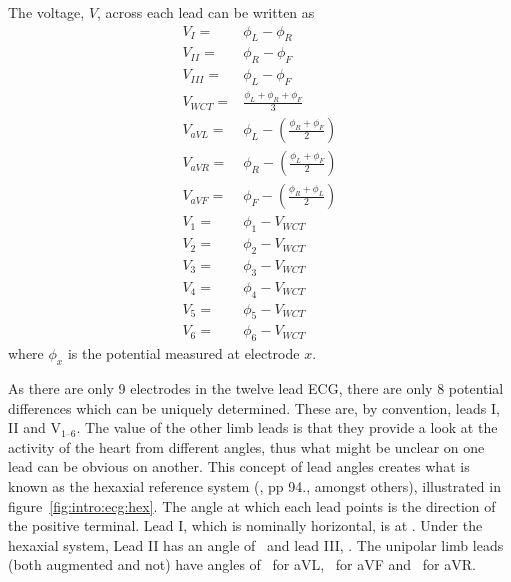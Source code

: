 The voltage, $V$, across each lead can be written as
\begin{subequations} \label{eqn:intro:leads}
\begin{align}
V_{I}  = &\phi_{L} - \phi_{R}\label{eqn:intro:leads:i}\\
V_{II}  = &\phi_{R} - \phi_{F}\label{eqn:intro:leads:ii} \\
V_{III}  = &\phi_{L} - \phi_{F}\label{eqn:intro:leads:iii}\\
V_{WCT}  = &\frac{\phi_{L} + \phi_{R} + \phi_{F}}{3}\label{eqn:intro:leads:wct}\\
V_{aVL} = &\phi_{L} - \left(\frac{\phi_{R} + \phi_{F}}{2}\right) \label{eqn:intro:leads:avl}\\
V_{aVR} = &\phi_{R} - \left(\frac{\phi_{L} + \phi_{F}}{2}\right)\label{eqn:intro:leads:avr} \\
V_{aVF} = & \phi_{F} - \left(\frac{\phi_{R} + \phi_{L}}{2}\right)\label{eqn:intro:leads:avf}\\
V_{1} = & \phi_1 - V_{WCT} \label{eqn:intro:leads:v1}\\
V_{2} = & \phi_2 - V_{WCT} \label{eqn:intro:leads:v2}\\
V_{3} = & \phi_3 - V_{WCT} \label{eqn:intro:leads:v3}\\
V_{4} = & \phi_4 - V_{WCT} \label{eqn:intro:leads:v4}\\
V_{5} = & \phi_5 - V_{WCT} \label{eqn:intro:leads:v5}\\
V_{6} = & \phi_6 - V_{WCT} \label{eqn:intro:leads:v6}
\end{align}
\end{subequations}
where $\phi_x$ is the potential measured at electrode $x$.

As there are only 9 electrodes in the twelve lead ECG, there are only 8
potential differences which can be uniquely determined.
These are, by convention, leads I, II and $\text{V}_{\text{1--6}}$.
The value of the other limb leads is that they provide a look at the activity of
the heart from different angles, thus what might be unclear on one lead can be
obvious on another.
This concept of lead angles creates what is known as the hexaxial reference
system (\cite{Lipman1994}, pp 94., amongst others), illustrated in
figure~\ref{fig:intro:ecg:hex}.
The angle at which each lead points is the direction of the positive terminal.
Lead I, which is nominally horizontal, is at .
Under the hexaxial system, Lead II has an angle of \ and lead III,
.
The unipolar limb leads (both augmented and not) have angles of \ for
aVL, \ for aVF and \ for aVR.

